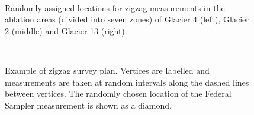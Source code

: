\documentclass{sfuthesis}
\begin{document}
\begin{figure}
	\centering
	\\
	\caption[Randomly assigned locations for zigzag measurements in the ablation areas of study glaciers]{Randomly assigned locations for zigzag measurements in the ablation areas (divided into seven zones) of Glacier 4 (left), Glacier 2 (middle) and Glacier 13 (right).}
	\label{zigzag_planned}
\end{figure}

\begin{figure}
	\centering
	\\
	\caption[Example of zigzag survey plan]{Example of zigzag survey plan. Vertices are labelled and measurements are taken at random intervals along the dashed lines between vertices. The randomly chosen location of the Federal Sampler measurement is shown as a diamond.}
	\label{zigzag_vertex}
\end{figure}
\end{document}
